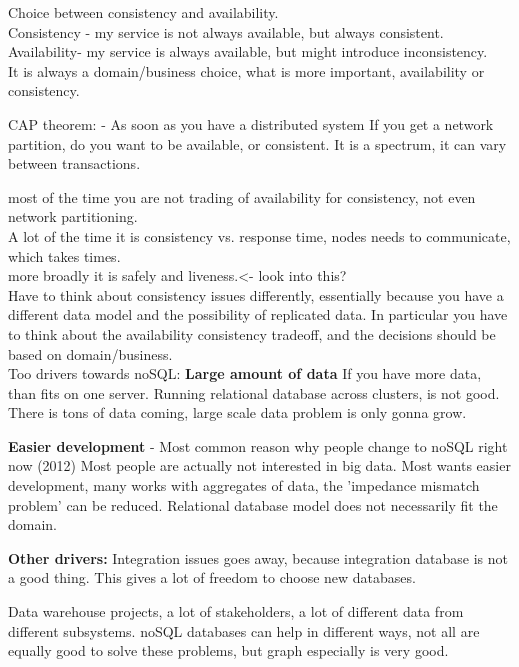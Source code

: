 Choice between consistency and availability.\\
Consistency - my service is not always available, but always consistent.\\
Availability- my service is always available, but might introduce inconsistency.\\
It is always a domain/business choice, what is more important, availability or consistency.

CAP theorem: - As soon as you have a distributed system
If you get a network partition, do you want to be available, or consistent.
It is a spectrum, it can vary between transactions.

most of the time you are not trading of availability for consistency, not even network partitioning.\\
A lot of the time it is consistency vs. response time, nodes needs to communicate, which takes times.\\
more broadly it is safely and liveness.<- look into this? \\

Have to think about consistency issues differently, essentially because you have a different data model and the possibility of replicated data. In particular you have to think about the availability consistency tradeoff, and the decisions should be based on domain/business.\\

Too drivers towards noSQL:
\textbf{Large amount of data}
If you have more data, than fits on one server. Running relational database across clusters, is not good.\\
There is tons of data coming, large scale data problem is only gonna grow. 

\textbf{Easier development} - Most common reason why people change to noSQL right now (2012)
Most people are actually not interested in big data.
Most wants easier development, many works with aggregates of data, the 'impedance mismatch problem' can be reduced. Relational database model does not necessarily fit the domain.

\textbf{Other drivers:}
Integration issues goes away, because integration database is not a good thing. This gives a lot of freedom to choose new databases.

Data warehouse projects, a lot of stakeholders, a lot of different data from different subsystems. noSQL databases can help in different ways, not all are equally good to solve these problems, but graph especially is very good.

